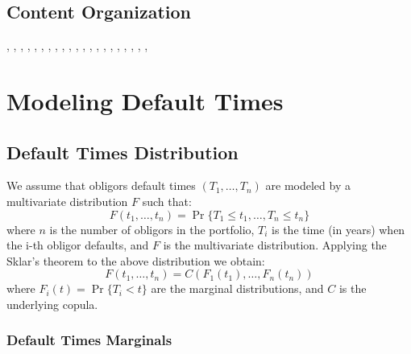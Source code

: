 \documentclass[11pt,fleqn]{book} %
\begin{document}
\section{Content Organization}

\cite{mcneil:2005}, \cite{sklar:1959}, \cite{li:2000}, 
\cite{roncalli:2001}, \cite{embrechts:2002}, \cite{cmetrics:1997},
\cite{ntzoufras:2009}, \cite{gordy:2002}, \cite{nagpal:2001},
\cite{meissner:2006}, \cite{bis:2006}, \cite{bluhm:2002},
\cite{frey:2001}, \cite{gossl:2005}, \cite{tarashev:2010},
\cite{creditrisk+:1997}, \cite{crouhy:2000}, \cite{koyluoglu:1998},
\cite{var:varbad}, \cite{var:eshortfall}, \cite{var:jorion},
\cite{basel2:2006}


\chapter{Modeling Default Times}

\section{Default Times Distribution}

We assume that obligors default times $(T_1, \dots, T_n)$ are modeled 
by a multivariate distribution $F$ such that:
\begin{displaymath}
	F(t_1, \dots, t_n) = \Pr \{T_1 \le t_1, \dots, T_n \le t_n\}
\end{displaymath}
where $n$ is the number of obligors in the portfolio, $T_i$ is the time 
(in years) when the i-th obligor defaults, and $F$ is the multivariate
distribution. Applying the Sklar's theorem to the above distribution 
we obtain:
\begin{displaymath}
	F(t_1, \dots, t_n) = C\left(F_1(t_1), \dots, F_n(t_n)\right) 
\end{displaymath}
where $F_i(t) = \Pr\{T_i < t\}$ are the marginal distributions, 
and $C$ is the underlying copula.

\subsection{Default Times Marginals}
\end{document}
